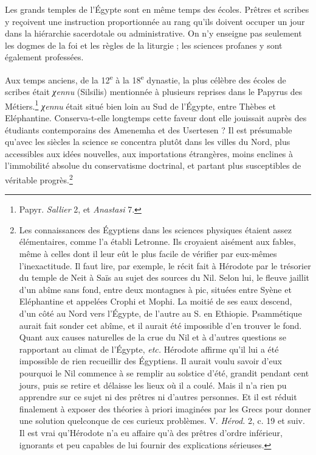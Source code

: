 \documentclass[a4paper, 11pt, oneside]{article}
\begin{document}
Les grands temples de l'Égypte sont en même temps des écoles. Prêtres et scribes y reçoivent une instruction proportionnée au rang qu'ils doivent occuper un jour dans la hiérarchie sacerdotale ou administrative. On n'y enseigne pas seulement les dogmes de la foi et les règles de la liturgie ; les sciences profanes y sont également professées.

Aux temps anciens, de la 12\textsuperscript{e} à la 18\textsuperscript{e} dynastie, la plus célèbre des écoles de scribes était \emph{χennu} (Silsilis) mentionnée à plusieurs reprises dans le Papyrus des Métiers.\footnote{Papyr. \emph{Sallier} 2, et \emph{Anastasi} 7.} \emph{χennu} était situé bien loin au Sud de l'Égypte, entre Thèbes et Eléphantine. Conserva-t-elle longtemps cette faveur dont elle jouissait auprès des étudiants contemporains des Amenemha et des Usertesen ? Il est présumable qu'avec les siècles la science se concentra plutôt dans les villes du Nord, plus accessibles aux idées nouvelles, aux importations étrangères, moins enclines à l'immobilité absolue du conservatisme doctrinal, et partant plus susceptibles de véritable progrès.\footnote{Les connaissances des Égyptiens dans les sciences physiques étaient assez élémentaires, comme l'a établi Letronne. Ils croyaient aisément aux fables, même à celles dont il leur eût le plus facile de vérifier par eux-mêmes l'inexactitude. Il faut lire, par exemple, le récit fait à Hérodote par le trésorier du temple de Neit à Saïs au sujet des sources du Nil. Selon lui, le fleuve jaillit d'un abîme sans fond, entre deux montagnes à pic, situées entre Syène et Eléphantine et appelées Crophi et Mophi. La moitié de ses eaux descend, d'un côté au Nord vers l'Égypte, de l'autre au S. en Ethiopie. Psammétique aurait fait sonder cet abîme, et il aurait été impossible d'en trouver le fond. Quant aux causes naturelles de la crue du Nil et à d'autres questions se rapportant au climat de l'Égypte, \emph{etc.} Hérodote affirme qu'il lui a été impossible de rien recueillir des Égyptiens.  Il aurait voulu savoir d'eux pourquoi le Nil commence à se remplir au solstice d'été, grandit pendant cent jours, puis se retire et délaisse les lieux où il a coulé. Mais il n'a rien pu apprendre sur ce sujet ni des prêtres ni d'autres personnes. Et il est réduit finalement à exposer des théories à priori imaginées par les Grecs pour donner une solution quelconque de ces curieux problèmes. V. \emph{Hérod.} 2, c. 19 et suiv.  Il est vrai qu'Hérodote n'a eu affaire qu'à des prêtres d'ordre inférieur, ignorants et peu capables de lui fournir des explications sérieuses.}
\end{document}
